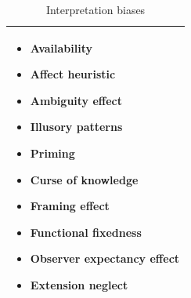 \documentclass[a4paper]{scrartcl}     %
\begin{document}
    \begin{table}
      \caption{Interpretation biases}
      \renewcommand{\arraystretch}{0}
      \begin{tabu} to \linewidth {X[1,l]}
        \toprule
         \begin{itemize}[label={}]
            \item Availability \citep{Tversky1973,Spirrison1994}
            \item Affect heuristic \citep{Zajonc1980,Peters2006}
            \item Ambiguity effect \citep{Ellsberg1961a,Crosby2007}
            \item Illusory patterns \citep{Kahneman1974,Whitson2008}
            \item Priming \citep{Meyer1971} %
            \item Curse of knowledge \citep{ColinCamerer1989,Lange2011}
            \item Framing effect \citep{Tversky1981,Cheng2012}
            \item Functional fixedness \citep{Adamson1952,Adamson1954}
            \item Observer expectancy effect \citep{Mahoney1977,Graber2002}
            \item Extension neglect \citep{KahnemanDaniel2000,Peters2006}
          \end{itemize} \\
        \bottomrule
      \end{tabu}
      \label{table:irs}
    \end{table}
\end{document}
